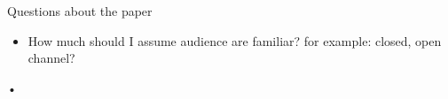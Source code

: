 Questions about the paper
\begin{itemize}
\item How much should I assume audience are familiar? for example: closed, open channel?

\end{itemize}•
